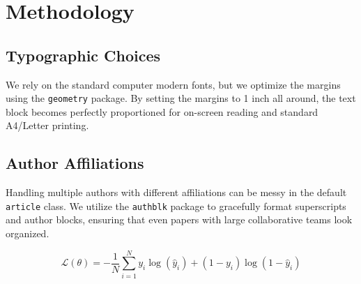 \section{Methodology}
\subsection{Typographic Choices}
We rely on the standard computer modern fonts, but we optimize the margins using the \texttt{geometry} package. By setting the margins to 1 inch all around, the text block becomes perfectly proportioned for on-screen reading and standard A4/Letter printing.

\subsection{Author Affiliations}
Handling multiple authors with different affiliations can be messy in the default \texttt{article} class. We utilize the \texttt{authblk} package to gracefully format superscripts and author blocks, ensuring that even papers with large collaborative teams look organized.

\begin{equation}
\mathcal{L}(\theta) = -\frac{1}{N} \sum_{i=1}^{N} y_i \log(\hat{y}_i) + (1 - y_i) \log(1 - \hat{y}_i)
\end{equation}

